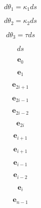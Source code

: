 \documentclass[a4paper,10pt,fleqn]{book}
\newcommand{\vect}[1]{\boldsymbol{#1}}
\begin{document}
\begin{equation}
d \theta_1 = \kappa_1 ds
\end{equation}


\begin{equation}
d \theta_2 = \kappa_2 ds
\end{equation}


\begin{equation}
d \theta_3 = \tau ds
\end{equation}


\begin{equation}
ds
\end{equation}


\begin{equation}
\vect{e}_0
\end{equation}


\begin{equation}
\vect{e}_1
\end{equation}


\begin{equation}
\vect{e}_{2i+1}
\end{equation}


\begin{equation}
\vect{e}_{2i-1}
\end{equation}


\begin{equation}
\vect{e}_{2i-2}
\end{equation}


\begin{equation}
\vect{e}_{2i}
\end{equation}


\begin{equation}
\vect{e}_{i+1}
\end{equation}


\begin{equation}
\vect{e}_{i+1}
\end{equation}


\begin{equation}
\vect{e}_{i-1}
\end{equation}


\begin{equation}
\vect{e}_{i-2}
\end{equation}


\begin{equation}
\vect{e}_i
\end{equation}


\begin{equation}
\vect{e}_{n-1}
\end{equation}
\end{document}
